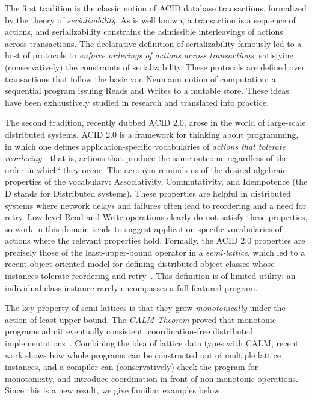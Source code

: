 \documentclass{sig-alternate}
\begin{document}
The first tradition is the classic notion of \textsf{ACID} database transactions, formalized by the theory of \emph{serializability}.  As is well known, a transaction is a sequence of actions, and serializability constrains the admissible interleavings of actions across transactions.  The declarative definition of serializability famously led to a host of protocols to \emph{enforce orderings of actions across transactions}, satisfying (conservatively) the constraints of serializability.  These protocols are defined over transactions that follow the basic von Neumann notion of computation: a sequential program issuing Reads and Writes to a mutable store.  These ideas have been exhaustively studied in research and translated into practice.

The second tradition, recently dubbed \textsf{ACID 2.0}, arose in the world of large-scale distributed systems.  ACID 2.0 is a framework for thinking about programming, in which one defines application-specific vocabularies of \emph{actions that tolerate reordering}---that is, 
actions that produce the same outcome regardless of the order in which` they occur.
The acronym reminds us of the desired algebraic properties of the vocabulary: Associativity, Commutativity, and Idempotence (the D stands for Distributed systems).  These properties are helpful in distributed systems where network delays and failures often lead to reordering and a need for retry. Low-level Read and Write operations clearly do not satisfy these properties, so work in this domain tends to suggest application-specific vocabularies of actions where the relevant properties hold.  Formally, the ACID 2.0 properties are precisely those of the least-upper-bound operator in a {\em semi-lattice}, which led to a recent object-oriented model for defining distributed object classes whose instances tolerate reordering and retry~\cite{CRDTs}.  This definition is of limited utility: an individual class instance rarely encompasses a full-featured program.  

The key property of semi-lattices is that they grow \emph{monotonically} under the action of least-upper bound.  The \emph{CALM Theorem} proved that monotonic programs admit eventually consistent, coordination-free distributed implementations~\cite{calm}.  Combining the idea of lattice data types with CALM, recent work shows how whole programs can be constructed out of multiple lattice instances, and a compiler can (conservatively) check the program for monotonicity, and introduce coordination in front of non-monotonic operations.  Since this is a new result, we give familiar examples below.
\end{document}
